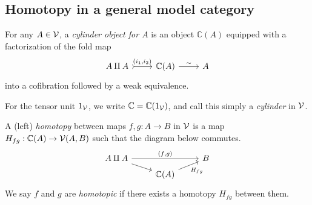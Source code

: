 \documentclass[a4paper,10pt
,draft
]{article}%
\renewcommand{\1}{\eta}%
\begin{document}
\subsection{Homotopy in a general model category}



\begin{definition}
      For any $A \in \mathcal V$, a \textit{cylinder object for $A$} is an object $\mathbb C(A)$ equipped with a factorization of the fold map
      \begin{equation}
            \begin{tikzcd}
                  A \amalg A \arrow[r, tail, "{(i_1,i_2)}"]
                  &
                  \mathbb C(A) \arrow[r, "\sim"]
                  &
                  A
            \end{tikzcd}
      \end{equation}
      into a cofibration followed by a weak equivalence.
      
      For the tensor unit $1_{\mathcal V}$, we write $\mathbb C = \mathbb C(1_{\mathcal V})$, and call this simply a \textit{cylinder} in $\mathcal V$.
      
      A (left) \textit{homotopy} between maps $f,g: A \to B$ in $\mathcal V$ is a map $H_{fg}: \mathbb C(A) \to \mathcal V(A,B)$ such that
      the diagram below commutes.
      \begin{equation}
            \begin{tikzcd}[row sep = tiny]
                  A \amalg A \arrow[rr, "{(f,g)}"] \arrow[dr]
                  &&
                  B
                  \\
                  &
                  \mathbb C(A) \arrow[ur, "H_{fg}"']
            \end{tikzcd}
      \end{equation}
      We say $f$ and $g$ are \textit{homotopic} if there exists a homotopy $H_{f g}$ between them.
\end{definition}

\end{document}
